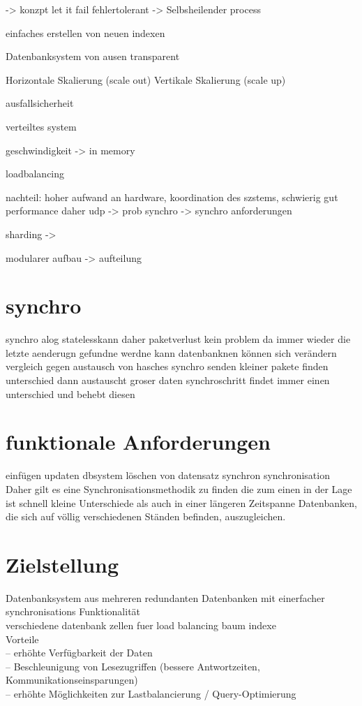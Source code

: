 \documentclass[a4paper,11pt,oneside,%
headsepline,												%
footsepline,												%
bibtotocnumbered									%
]{scrreprt}
\begin{document}
-> konzpt let it fail fehlertolerant 
-> Selbsheilender process

einfaches erstellen von neuen indexen

Datenbanksystem von ausen transparent

Horizontale Skalierung (scale out)  Vertikale Skalierung (scale up)

ausfallsicherheit

verteiltes system

geschwindigkeit -> in memory

loadbalancing

nachteil: hoher aufwand an hardware, koordination des szstems, schwierig gut performance daher udp -> prob synchro -> synchro anforderungen

sharding ->

modularer aufbau -> aufteilung 
\section{synchro}
synchro alog statelesskann daher paketverlust kein problem da immer wieder die letzte aenderugn gefundne werdne kann
datenbanknen können sich verändern
vergleich gegen austausch von hasches
synchro senden kleiner pakete finden unterschied dann austauscht groser daten
synchroschritt findet immer einen unterschied und behebt diesen
\section{funktionale Anforderungen}
einfügen
updaten
dbsystem löschen von datensatz synchron
synchronisation
Daher gilt es eine Synchronisationsmethodik zu finden die zum einen in der Lage ist schnell kleine Unterschiede als auch in einer längeren Zeitspanne Datenbanken, die sich auf völlig verschiedenen Ständen befinden, auszugleichen.

\section{Zielstellung}
Datenbanksystem aus mehreren redundanten Datenbanken mit einerfacher synchronisations Funktionalität\\

verschiedene datenbank zellen fuer load balancing
baum indexe\\

Vorteile\\
– erhöhte Verfügbarkeit der Daten\\
– Beschleunigung von Lesezugriffen (bessere Antwortzeiten,
Kommunikationseinsparungen)\\
– erhöhte Möglichkeiten zur Lastbalancierung / Query-Optimierung\\
\end{document}

